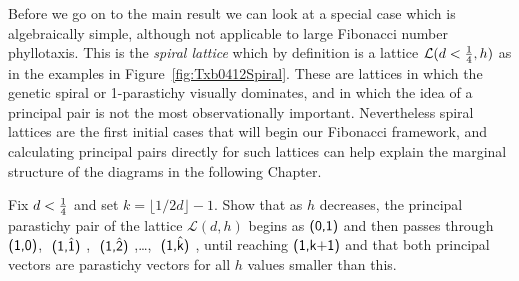 Before we go on to the main result we can look at a special case which is algebraically simple, although not applicable to large Fibonacci number phyllotaxis. This is the \emph{spiral lattice} which by definition is a lattice $\mathcal{L}(d<\textstyle{\frac{1}{4}},h)$ as in the examples in Figure~\ref{fig:Txb0412Spiral}. These are lattices in which
the genetic spiral or 1-parastichy visually dominates, and in which the idea of a principal pair is not the most observationally important. 
%
Nevertheless spiral lattices are the first initial cases that will begin
our Fibonacci framework, and calculating principal pairs directly for such lattices can help explain the marginal structure of the diagrams in the following Chapter.
\begin{jExercise}\label{ex:pspiral}
	Fix  $d<\textstyle{\frac{1}{4}}$ and set  $k=\lfloor1/2d\rfloor-1$.
	Show that as $h$ decreases, the principal parastichy pair of the lattice $\mathcal{L}(d,h)$ begins as 
	 $\textsf{(0,1)}$ and then passes through $\textsf{(1,0)}$,  $\textsf{ (\ensuremath{\textsf{1}},\ensuremath{\hat{\textsf{1}}}) }$,
	  $\textsf{ (\ensuremath{\textsf{1}},\ensuremath{\hat{\textsf{2}}}) }$,\ldots ,  $\textsf{ (\ensuremath{\textsf{1}},\ensuremath{\hat{\textsf{k}}}) }$, until reaching $\textsf{(1,k+1)}$ and that  both principal vectors are parastichy vectors for all $h$ values smaller than this. 
	 
\end{jExercise} 
